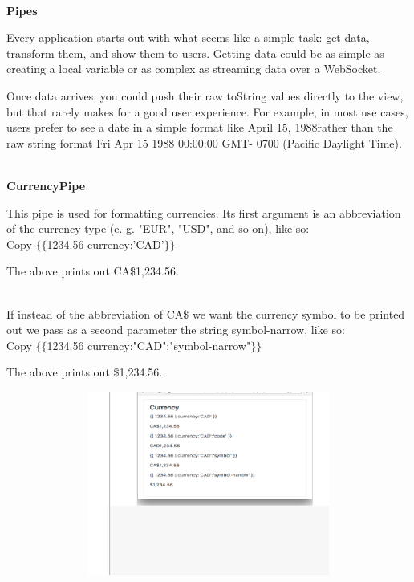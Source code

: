 \documentclass{article}
\begin{document}
\noindent \textbf{}

\noindent \\ {\large \textbf{Pipes}}

\noindent 

\noindent Every application starts out with what seems like a simple task: get data, transform them, and show them to users. Getting data could be as simple as creating a local variable or as complex as streaming data over a WebSocket.

\noindent Once data arrives, you could push their raw toString values directly to the view, but that rarely makes for a good user experience. For example, in most use cases, users prefer to see a date in a simple format like April 15, 1988rather than the raw string format Fri Apr 15 1988 00:00:00 GMT- 0700 (Pacific Daylight Time).

\noindent 

\noindent \\ {\large \textbf{CurrencyPipe}}

\noindent This pipe is used for formatting currencies. Its first argument is an abbreviation of the currency type (e. g. "EUR", "USD", and so on), like so: \\ 

  

\noindent Copy $\mathrm{\{}$$\mathrm{\{}$1234.56 {\textbar} currency:'CAD'$\mathrm{\}}$$\mathrm{\}}$ 

\noindent 

\noindent The above prints out CA\$1,234.56.

\noindent \\ If instead of the abbreviation of CA\$ we want the currency symbol to be printed out we pass as a second parameter the string symbol-narrow, like so: \\

  

\noindent Copy $\mathrm{\{}$$\mathrm{\{}$1234.56 {\textbar} currency:"CAD":"symbol-narrow"$\mathrm{\}}$$\mathrm{\}}$ 

\noindent 

\noindent The above prints out \$1,234.56.

\begin{center}
	\noindent \includegraphics*[width=5.46in, height=2.39in, trim=1.49in 1.67in 0.50in 0.05in]{IMG-03-01}
\end{center}
\end{document}
